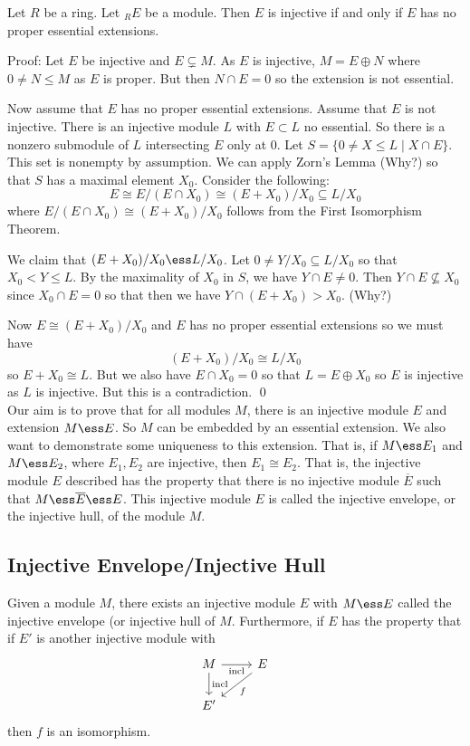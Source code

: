 \begin{prop}
Let $R$ be a ring. Let $_R E$ be a module. Then $E$ is injective if and only if $E$ has no proper essential extensions. 
\end{prop}

Proof: Let $E$ be injective and $E \subsetneq M$. As $E$ is injective, $M=E \oplus N$ where $0 \neq N \leq M$ as $E$ is proper. But then $N \cap E=0$ so the extension is not essential. 

Now assume that $E$ has no proper essential extensions. Assume that $E$ is not injective. There is an injective module $L$ with $E \subset L$ no essential. So there is a nonzero submodule of $L$ intersecting $E$ only at 0. Let $S=\{0 \neq X \leq L\;|\; X \cap E\}$. This set is nonempty by assumption. We can apply Zorn's Lemma (Why?) so that $S$ has a maximal element $X_0$. Consider the following:
\[
E \cong E/(E \cap X_0) \cong (E+X_0)/X_0 \subseteq L/X_0
\]
where $E/(E\cap X_0) \cong (E+X_0)/X_0$ follows from the First Isomorphism Theorem. 

We claim that $(E+X_0)/X_0 \ess L/X_0$. Let $0 \neq Y/X_0 \subseteq L/X_0$ so that $X_0 <Y \leq L$. By the maximality of $X_0$ in $S$, we have $Y \cap E \neq 0$. Then $Y \cap E \not\subseteq X_0$ since $X_0 \cap E=0$ so that then we have $Y \cap (E+X_0) >X_0$. (Why?)

Now $E \cong (E+X_0)/X_0$ and $E$ has no proper essential extensions so we must have
\[
(E+X_0)/X_0 \cong L/X_0
\]
so $E+X_0 \cong L$. But we also have $E \cap X_0=0$ so that $L=E\oplus X_0$ so $E$ is injective as $L$ is injective. But this is a contradiction. \qed \\

Our aim is to prove that for all modules $M$, there is an injective module $E$ and extension $M \ess E$. So $M$ can be embedded by an essential extension. We also want to demonstrate some uniqueness to this extension. That is, if $M \ess E_1$ and $M \ess E_2$, where $E_1,E_2$ are injective, then $E_1 \cong E_2$. That is, the injective module $E$ described has the property that there is no injective module $\overline{E}$ such that $M \ess \overline{E} \ess E$. This injective module $E$ is called the injective envelope, or the injective hull, of the module $M$. 

\subsection{Injective Envelope/Injective Hull}

\begin{dfn}
Given a module $M$, there exists an injective module $E$ with $M \ess E$ called the injective envelope (or injective hull of $M$. Furthermore, if $E$ has the property that if $E'$ is another injective module with
\[
\begin{tikzcd}
M \arrow[swap]{r}{\text{incl}} \arrow{d}{\text{incl}} & E \arrow{dl}{f} \\
E' & 
\end{tikzcd}
\]
then $f$ is an isomorphism. 
\end{dfn}

